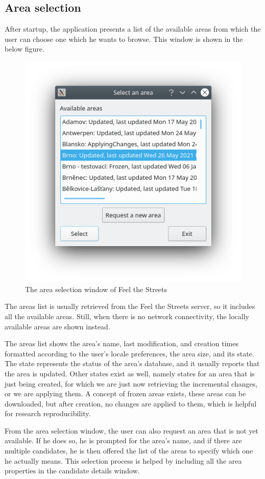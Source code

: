 \documentclass[nolof,digital]{fithesis3}
\begin{document}
\subsection{Area selection}
After startup, the application presents a list of the available areas from which the user can choose one which he wants to browse. This window is shown in the below figure.
\begin{figure}[h]
\caption{The area selection window of Feel the Streets}
\includegraphics{fts-areas}
\end{figure}
The areas list is usually retrieved from the Feel the Streets server, so it includes all the available areas. Still, when there is no network connectivity, the locally available areas are shown instead.

The areas list shows the area's name, last modification, and creation times formatted according to the user's locale preferences, the area size, and its state. The state represents the status of the area's database, and it usually reports that the area is updated. Other states exist as well, namely states for an area that is just being created, for which we are just now retrieving the incremental changes, or we are applying them. A  concept of frozen areas exists, these areas can be downloaded, but after creation, no changes are applied to them, which is helpful for research reproducibility.

From the area selection window, the user can also request an area that is not yet available. If he does so, he is prompted for the area's name, and if there are multiple candidates, he is then offered the list of the areas to specify which one he actually means. This selection process is helped by including all the area properties in the candidate details window.
\end{document}
